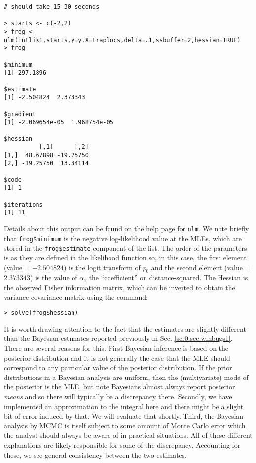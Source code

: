 {\small 
\begin{verbatim}
# should take 15-30 seconds

> starts <- c(-2,2)
> frog <- nlm(intlik1,starts,y=y,X=traplocs,delta=.1,ssbuffer=2,hessian=TRUE)
> frog

$minimum
[1] 297.1896

$estimate
[1] -2.504824  2.373343

$gradient
[1] -2.069654e-05  1.968754e-05

$hessian
          [,1]      [,2]
[1,]  48.67898 -19.25750
[2,] -19.25750  13.34114

$code
[1] 1

$iterations
[1] 11
\end{verbatim}
} 
Details about this output can be found on the help page for
\mbox{\tt nlm}. We note briefly that \mbox{\tt frog\$minimum} is the
negative log-likelihood value at the MLEs, which are stored in the
\mbox{\tt frog\$estimate} component of the list. The order of the
parameters is as they are defined in the likelihood function so, in
this case, the first element (value =  $-2.504824$) is the 
logit transform of $p_0$ and the second element (value = $2.373343$)
is the value of $\alpha_{1}$ the ``coefficient'' on distance-squared.  
The Hessian is the
observed Fisher information matrix, which can be inverted to obtain
the variance-covariance matrix using the command:
\begin{verbatim}
> solve(frog$hessian)
\end{verbatim}

It is worth drawing attention to the fact that the estimates are slightly
different than the Bayesian estimates reported previously in
Sec. \ref{scr0.sec.winbugs1}.   There are several reasons
for this.  First Bayesian inference is based on the posterior
distribution and it is not generally the case that the MLE should
correspond to any particular value of the posterior distribution. If
the prior distributions in a Bayesian analysis are uniform, then the
(multivariate) mode of the posterior is the MLE, but note 
Bayesians almost always report posterior {\it means} and so there will
typically be a discrepancy there. Secondly, we have implemented an
approximation to the integral here and there might be a slight bit of
error induced by that. We will evaluate that shortly. Third, the
Bayesian analysis by MCMC is itself subject to some amount of Monte Carlo
error which the analyst should always be aware of in practical
situations.  All of these different explanations are likely
responsible for some of the discrepancy. Accounting for these, we see
general consistency between the two estimates.

